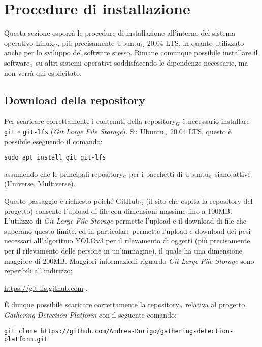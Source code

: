\section{Procedure di installazione}\label{RequisitiDiSistemaEdInstallazioneInstallazione}
Questa sezione esporrà le procedure di installazione all'interno del sistema operativo Linux$_G$, più precisamente Ubuntu$_G$ 20.04 LTS, in quanto utilizzato anche per lo sviluppo del software stesso.
Rimane comunque possibile installare il software$_{\scaleto{G}{3pt}}$ su altri sistemi operativi soddisfacendo le dipendenze necessarie, ma non verrà qui esplicitato.

\subsection{Download della  repository}\label{RequisitiDiSistemaEdInstallazioneInstallazioneDownloadRepo}
Per scaricare correttamente i contenuti della repository$_G$ è necessario installare \texttt{git} e \texttt{git-lfs} (\textit{Git Large File Storage}).
Su Ubuntu$_{\scaleto{G}{3pt}}$ 20.04 LTS, questo è possibile eseguendo il comando:
\begin{lstlisting}
sudo apt install git git-lfs
\end{lstlisting}
assumendo che le principali repository$_{\scaleto{G}{3pt}}$ per i pacchetti di Ubuntu$_{\scaleto{G}{3pt}}$ siano attive (Universe, Multiverse).

Questo passaggio è richiesto poiché GitHub$_G$ (il sito che ospita la repository del progetto) consente l'upload di file con dimensioni massime fino a 100MB.
L'utilizzo di \textit{Git Large File Storage} permette l'upload e il download di file che superano questo limite, ed in particolare permette l'upload e download dei pesi necessari all'algoritmo YOLOv3 per il rilevamento di oggetti (più precisamente per il rilevamento delle persone in un'immagine), il quale ha una dimensione maggiore di 200MB. Maggiori informazioni riguardo \textit{Git Large File Storage} sono reperibili all'indirizzo:
\begin{center}
	\item \url{https://git-lfs.github.com} .
\end{center}

È dunque possibile scaricare correttamente la repository$_{\scaleto{G}{3pt}}$ relativa al progetto \textit{Gathering-Detection-Platform} con il seguente comando:
\begin{lstlisting}
git clone https://github.com/Andrea-Dorigo/gathering-detection-platform.git
\end{lstlisting}

